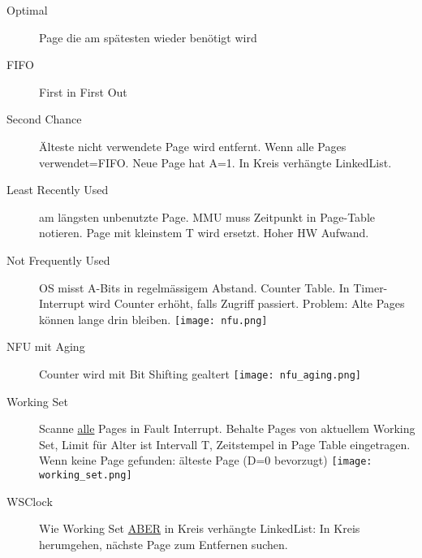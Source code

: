 \begin{multicols*}{4}
\begin{description}
    \item[Optimal] Page die am spätesten wieder benötigt wird
    \item[FIFO] First in First Out
    \item[Second Chance] Älteste nicht verwendete Page wird entfernt. Wenn alle Pages verwendet=FIFO. Neue Page hat A=1. In Kreis verhängte LinkedList.
    \item[Least Recently Used] am längsten unbenutzte Page. MMU muss Zeitpunkt in Page-Table notieren. Page mit kleinstem T wird ersetzt. Hoher HW Aufwand.
    \item[Not Frequently Used] OS misst A-Bits in regelmässigem Abstand. Counter Table. In Timer-Interrupt wird Counter erhöht, falls Zugriff passiert. Problem: Alte Pages können lange drin bleiben.  \texttt{[image: nfu.png]}
    \item[NFU mit Aging] Counter wird mit Bit Shifting gealtert \texttt{[image: nfu\_aging.png]}
    \item[Working Set] Scanne \underline{alle} Pages in Fault Interrupt. Behalte Pages von aktuellem Working Set, Limit für Alter ist Intervall T, Zeitstempel in Page Table eingetragen. Wenn keine Page gefunden: älteste Page (D=0 bevorzugt)
    \texttt{[image: working\_set.png]}
    \item[WSClock] Wie Working Set \underline{ABER} in Kreis verhängte LinkedList: In Kreis herumgehen, nächste Page zum Entfernen suchen.
\end{description}


\end{multicols*}

